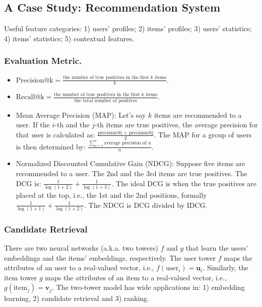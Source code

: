 \subsection{A Case Study: Recommendation System}
    Useful feature categories: 1) users' profiles; 2) items' profiles; 3) users' statistics; 4) items' statistics; 5) contextual features. 
    
        \subsubsection{Evaluation Metric.}
            \begin{itemize}
                \item $\text{Precision@k} = \frac{\text{the number of true positives in the first $k$ items}}{k}$.
                \item $\text{Recall@k} = \frac{\text{the number of true positives in the first $k$ items}}{\text{the total number of positives}}$.
                \item Mean Average Precision (MAP): Let's say $k$ items are recommended to a user. If the $i$-th and the $j$-th items are true positives, the average precision for that user is calculated as: $\frac{\text{precision@i + precision@j}}{2}$. The MAP for a group of users is then determined by: $\frac{\sum_{u=1}^{n}{\text{average precision of $u$}}}{n}$.
                \item Normalized Discounted Cumulative Gain (NDCG): Suppose five items are recommended to a user. 
                      The 2nd and the 3rd items are true positives.
                      The DCG  is: $\frac{1}{\log{(1 + 2)}} + \frac{1}{\log{(1 + 3)}}$.
                      The ideal DCG is when the true positives are placed at the top, i.e., the 1st and the 2nd positions, formally $\frac{1}{\log{(1 + 1)}} + \frac{1}{\log{(1 + 2)}}$.
                      The NDCG is DCG divided by IDCG. 
            \end{itemize}

    \subsubsection{Candidate Retrieval}
        There are two neural networks (a.k.a. two towers) $f$ and $g$ that learn the users' embeddings and the items' embeddings, respectively.
        The user tower $f$ maps the attributes of an user to a real-valued vector, i.e., $f(\text{user}_i) = \bm{u}_i$.
        Similarly, the item tower $g$ maps the attributes of an item to a real-valued vector, i.e., $g(\text{item}_j) = \bm{v}_j$.
        The two-tower model has wide applications in: 1) embedding learning, 2) candidate retrieval and 3) ranking. 

